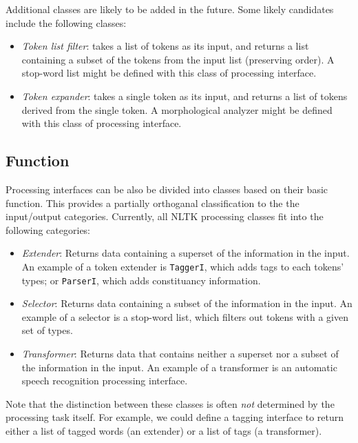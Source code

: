 \documentclass[11pt]{article}
\begin{document}
Additional classes are likely to be added in the future.  Some likely
candidates include the following classes:

\begin{itemize}
\item \textit{Token list filter}: takes a list of tokens as its
  input, and returns a list containing a subset of the tokens from the
  input list (preserving order).  A stop-word list might be defined
  with this class of processing interface.
\item \textit{Token expander}: takes a single token as its input, and
  returns a list of tokens derived from the single token.  A
  morphological analyzer might be defined with this class of
  processing interface.
\end{itemize}

\subsection{Function}

Processing interfaces can be also be divided into classes based on
their basic function.  This provides a partially orthoganal
classification to the the input/output categories.  Currently, all
NLTK processing classes fit into the following categories:

\begin{itemize}
\item \textit{Extender}: Returns data containing a superset of the
  information in the input.  An example of a token extender is
  \texttt{TaggerI}, which adds tags to each tokens' types; or
  \texttt{ParserI}, which adds constituancy information.
\item \textit{Selector}: Returns data containing a subset of the
  information in the input.  An example of a selector is a stop-word
  list, which filters out tokens with a given set of types.
\item \textit{Transformer}: Returns data that contains neither a
  superset nor a subset of the information in the input.  An example
  of a transformer is an automatic speech recognition processing
  interface.
\end{itemize}

Note that the distinction between these classes is often \textit{not}
determined by the processing task itself.  For example, we could
define a tagging interface to return either a list of tagged words (an
extender) or a list of tags (a transformer).

\end{document}
